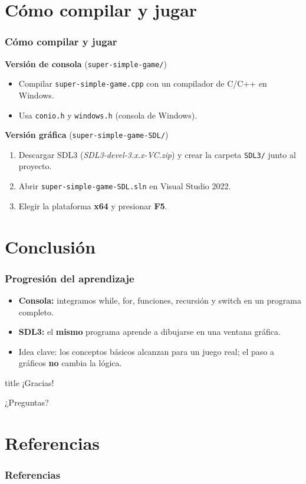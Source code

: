 \documentclass[]{beamer}
\begin{document}
\section{Cómo compilar y jugar}
\begin{frame}
  \frametitle{Cómo compilar y jugar}
  \textbf{Versión de consola} (\texttt{super-simple-game/})
  \begin{itemize}
    \item Compilar \texttt{super-simple-game.cpp} con un compilador de C/C++ en Windows.
    \item Usa \texttt{conio.h} y \texttt{windows.h} (consola de Windows).
  \end{itemize}
  \vspace{0.8em}
  \textbf{Versión gráfica} (\texttt{super-simple-game-SDL/})
  \begin{enumerate}
    \item Descargar SDL3 (\emph{SDL3-devel-3.x.x-VC.zip}) y crear la carpeta \texttt{SDL3/} junto al proyecto.
    \item Abrir \texttt{super-simple-game-SDL.sln} en Visual Studio 2022.
    \item Elegir la plataforma \textbf{x64} y presionar \textbf{F5}.
  \end{enumerate}
\end{frame}

\section{Conclusión}
\begin{frame}
  \frametitle{Progresión del aprendizaje}
  \begin{itemize}
    \item \textbf{Consola:} integramos while, for, funciones, recursión y switch en un programa completo.
    \item \textbf{SDL3:} el \textbf{mismo} programa aprende a dibujarse en una ventana gráfica.
    \item Idea clave: los conceptos básicos alcanzan para un juego real; el paso a gráficos \textbf{no} cambia la lógica.
  \end{itemize}
\end{frame}

\begin{frame}
  \begin{center}
    \begin{beamercolorbox}[sep=8pt,center]{title}
      \Large{¡Gracias!}
    \end{beamercolorbox}
    \vspace{1em}
    \huge{¿Preguntas?}\\
    \vspace{1em}
    \small{\email}
  \end{center}
\end{frame}

\section{Referencias}
\begin{frame}[allowframebreaks]
  \frametitle{Referencias}
  
  
\end{frame}
\end{document}
